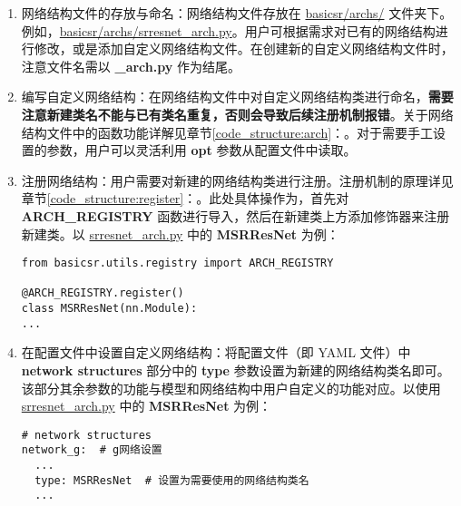 \documentclass[../main.tex]{subfiles}
\begin{document}
\begin{enumerate}[第 1 步]
    \item 网络结构文件的存放与命名：网络结构文件存放在 \href{https://github.com/XPixelGroup/BasicSR/tree/master/basicsr/archs}{basicsr/archs/} 文件夹下。例如，\href{https://github.com/XPixelGroup/BasicSR/tree/master/basicsr/archs}{basicsr/archs/srresnet\_arch.py}。用户可根据需求对已有的网络结构进行修改，或是添加自定义网络结构文件。在创建新的自定义网络结构文件时，注意文件名需以  \textbf{\_arch.py} 作为结尾。

    \item 编写自定义网络结构：在网络结构文件中对自定义网络结构类进行命名，\textbf{需要注意新建类名不能与已有类名重复，否则会导致后续注册机制报错}。关于网络结构文件中的函数功能详解见章节\ref{code_structure:arch}：。对于需要手工设置的参数，用户可以灵活利用 \textbf{opt} 参数从配置文件中读取。

    \item 注册网络结构：用户需要对新建的网络结构类进行注册。注册机制的原理详见章节\ref{code_structure:register}：。此处具体操作为，首先对 \textbf{ARCH\_REGISTRY} 函数进行导入，然后在新建类上方添加修饰器来注册新建类。以 \href{https://github.com/XPixelGroup/BasicSR/tree/master/basicsr/archs/srresnet_arch.py}{srresnet\_arch.py} 中的 \textbf{MSRResNet} 为例：
\begin{verbatim}
from basicsr.utils.registry import ARCH_REGISTRY

@ARCH_REGISTRY.register()
class MSRResNet(nn.Module):
...
\end{verbatim}

    \item 在配置文件中设置自定义网络结构：将配置文件（即 YAML 文件）中 \textbf{network structures} 部分中的 \textbf{type} 参数设置为新建的网络结构类名即可。
          该部分其余参数的功能与模型和网络结构中用户自定义的功能对应。以使用 \href{https://github.com/XPixelGroup/BasicSR/tree/master/basicsr/archs/srresnet_arch.py}{srresnet\_arch.py} 中的 \textbf{MSRResNet} 为例：

\begin{verbatim}
# network structures
network_g:  # g网络设置
  ...
  type: MSRResNet  # 设置为需要使用的网络结构类名
  ...
\end{verbatim}
\end{enumerate}

\end{document}
